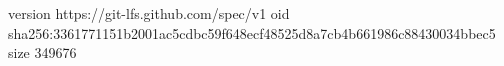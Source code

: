 version https://git-lfs.github.com/spec/v1
oid sha256:3361771151b2001ac5cdbc59f648ecf48525d8a7cb4b661986c88430034bbec5
size 349676
